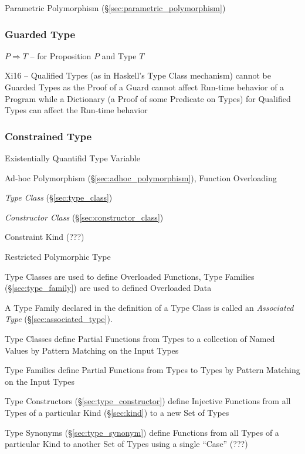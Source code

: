 Parametric Polymorphism (\S\ref{sec:parametric_polymorphism})



\subsubsection{Guarded Type}\label{sec:guarded_type}

$P \Rightarrow T$ -- for Proposition $P$ and Type $T$

Xi16 -- Qualified Types (as in Haskell's Type Class mechanism) cannot
be Guarded Types as the Proof of a Guard cannot affect Run-time
behavior of a Program while a Dictionary (a Proof of some Predicate on
Types) for Qualified Types can affect the Run-time behavior



\subsubsection{Constrained Type}\label{sec:constrained_type}

Existentially Quantifid Type Variable

Ad-hoc Polymorphism (\S\ref{sec:adhoc_polymorphism}), Function
Overloading

\emph{Type Class} (\S\ref{sec:type_class})

\emph{Constructor Class} (\S\ref{sec:constructor_class})

Constraint Kind (???) %

Restricted Polymorphic Type %

Type Classes are used to define Overloaded Functions, Type Families
(\S\ref{sec:type_family}) are used to defined Overloaded Data

A Type Family declared in the definition of a Type Class is called an
\emph{Associated Type} (\S\ref{sec:associated_type}).

Type Classes define Partial Functions from Types to a collection of
Named Values by Pattern Matching on the Input Types

\fist Type Families define Partial Functions from Types to Types by
Pattern Matching on the Input Types

\fist Type Constructors (\S\ref{sec:type_constructor}) define
Injective Functions from all Types of a particular Kind
(\S\ref{sec:kind}) to a new Set of Types

\fist Type Synonyms (\S\ref{sec:type_synonym}) define Functions from
all Types of a particular Kind to another Set of Types using a single
``Case'' (???) %



